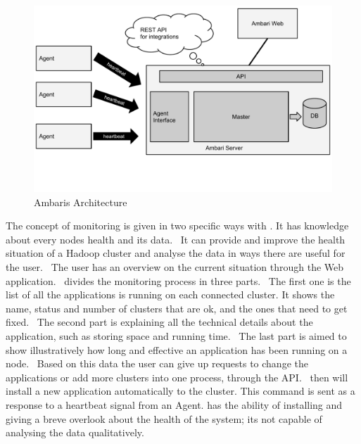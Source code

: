 \begin{figure}
  \centering
  \includegraphics[width=\linewidth,clip=true,trim=0 3cm 0 0]{images/AmbariArchitecture}
  \caption{Ambaris Architecture~\cite{Sako, Sako2013}}
  \label{fig:AmbariArchitecture}
\end{figure}

The concept of monitoring is given in two specific ways with \amb. 
It has knowledge about every nodes health and its data.~\cite{Foley2012} 
It can provide and improve the health situation of a Hadoop cluster and analyse the data in ways there are useful for the user.~\cite{Foley2012} 
The user has an overview on the current situation through the Web application.~\cite{Foley2012} 
\amb divides the monitoring process in three parts.~\cite{Foley2012} 
The first one is the list of all the applications \amb is running on each connected cluster. 
It shows the name, status and number of clusters that are ok, and the ones that need to get fixed.~\cite{Foley2012} 
The second part is explaining all the technical details about the application, such as storing space and running time.~\cite{Foley2012} 
The last part is aimed to show illustratively how long and effective an application has been running on a node.~\cite{Foley2012} 
Based on this data the user can give up requests to change the applications or add more clusters into one process, through the API.~\cite{Sako} 
\amb then will install a new application automatically to the cluster. This command is sent as a response to a heartbeat signal from an \amb Agent. \cite{Sako} 
\amb has the ability of installing and giving a breve overlook about the health of the system; its not capable of analysing the data qualitatively.\cite{Sako}


